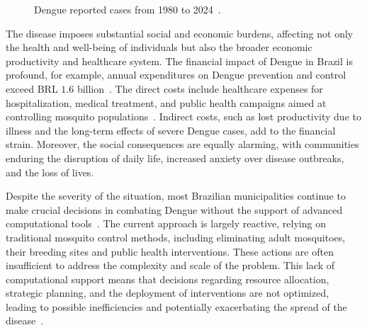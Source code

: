 \begin{figure}[h!]
	\caption{Dengue reported cases from 1980 to 2024~\citep{paho-1}.}
	\label{fig:dengue_reported_cases_graphic}
\end{figure}

The disease imposes substantial social and economic burdens, affecting not only
the health and well-being of individuals but also the broader economic
productivity and healthcare system. The financial impact of Dengue in Brazil is
profound, for example, annual expenditures on Dengue prevention and control
exceed BRL $1.6$ billion~\citep{negreiros-2020}. The direct costs include
healthcare expenses for hospitalization, medical treatment, and public health
campaigns aimed at controlling mosquito populations~\citep{negreiros:2008}.
Indirect costs, such as lost productivity due to illness and the long-term
effects of severe Dengue cases, add to the financial strain. Moreover, the
social consequences are equally alarming, with communities enduring the
disruption of daily life, increased anxiety over disease outbreaks, and the loss
of lives.

Despite the severity of the situation, most Brazilian municipalities continue to
make crucial decisions in combating Dengue without the support of advanced
computational tools~\citep{brasil-dept-helth:2009}. The current approach is
largely reactive, relying on traditional mosquito control methods, including
eliminating adult mosquitoes, their breeding sites and public health
interventions. These actions are often insufficient to address the complexity
and scale of the problem. This lack of computational support means that
decisions regarding resource allocation, strategic planning, and the deployment
of interventions are not optimized, leading to possible inefficiencies and
potentially exacerbating the spread of the
disease~\citep{forbes-2002,xie-2015,rais-2011}.

